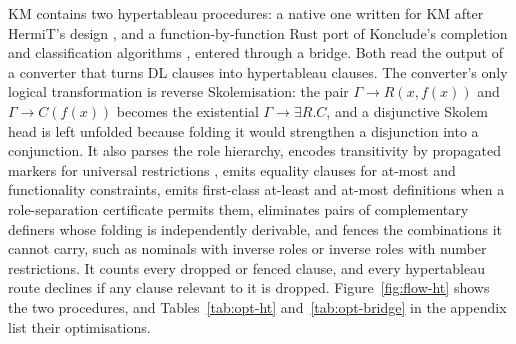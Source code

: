 KM contains two hypertableau procedures: a native one written for KM after
HermiT's design \cite{motik2009hypertableau,glimm2014hermit}, and a
function-by-function Rust port of Konclude's completion and classification
algorithms \cite{steigmiller2014konclude,steigmiller2016thesis}, entered through
a bridge.  Both read the output of a converter that turns DL clauses into
hypertableau clauses.  The converter's only logical transformation is reverse
Skolemisation: the pair $\Gamma\rightarrow R(x,f(x))$ and
$\Gamma\rightarrow C(f(x))$ becomes the existential $\Gamma\rightarrow\exists R.C$,
and a disjunctive Skolem head is left unfolded because folding it would
strengthen a disjunction into a conjunction.  It also parses the role
hierarchy, encodes transitivity by propagated markers for universal
restrictions \cite{horrocks1999transinv}, emits equality clauses for at-most
and functionality constraints, emits first-class at-least and at-most
definitions when a role-separation certificate permits them, eliminates pairs
of complementary definers whose folding is independently derivable, and fences
the combinations it cannot carry, such as nominals with inverse roles or
inverse roles with number restrictions.  It counts every dropped or fenced
clause, and every hypertableau route declines if any clause relevant to it is
dropped.  Figure~\ref{fig:flow-ht} shows the two
procedures, and Tables~\ref{tab:opt-ht} and~\ref{tab:opt-bridge} in the appendix
list their optimisations.

